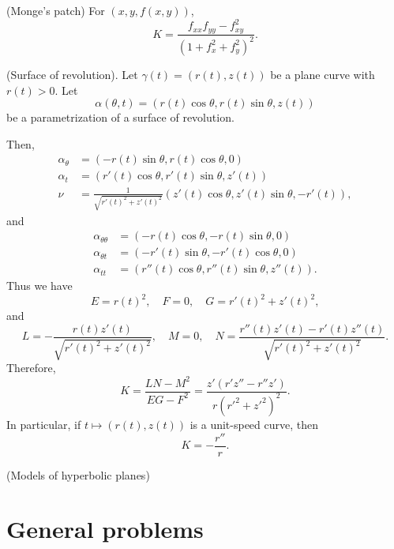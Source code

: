 \documentclass{../note}
\def\a{\alpha}
\begin{document}
\begin{ex}
\begin{parts}
\item
(Monge's patch)
For $(x,y,f(x,y))$,
\[K=\frac{f_{xx}f_{yy}-f_{xy}^2}{(1+f_x^2+f_y^2)^2}.\]
\item
(Surface of revolution).
Let $\gamma(t)=(r(t),z(t))$ be a plane curve with $r(t)>0$.
Let
\[\a(\theta,t)=(r(t)\cos\theta,r(t)\sin\theta,z(t))\]
be a parametrization of a surface of revolution.

Then,
\begin{align*}
\a_\theta&=(-r(t)\sin\theta,r(t)\cos\theta,0)\\
\a_t&=(r'(t)\cos\theta,r'(t)\sin\theta,z'(t))\\
\nu&=\frac1{\sqrt{r'(t)^2+z'(t)^2}}(z'(t)\cos\theta,z'(t)\sin\theta,-r'(t)),
\end{align*}
and
\begin{align*}
\a_{\theta\theta}&=(-r(t)\cos\theta,-r(t)\sin\theta,0)\\
\a_{\theta t}&=(-r'(t)\sin\theta,-r'(t)\cos\theta,0)\\
\a_{tt}&=(r''(t)\cos\theta,r''(t)\sin\theta,z''(t)).
\end{align*}
Thus we have
\[E=r(t)^2,\quad F=0,\quad G=r'(t)^2+z'(t)^2,\]
and
\[L=-\frac{r(t)z'(t)}{\sqrt{r'(t)^2+z'(t)^2}},\quad M=0,\quad N=\frac{r''(t)z'(t)-r'(t)z''(t)}{\sqrt{r'(t)^2+z'(t)^2}}.\]
Therefore,
\[K=\frac{LN-M^2}{EG-F^2}=\frac{z'(r'z''-r''z')}{r(r'^2+z'^2)^2}.\]
In particular, if $t\mapsto(r(t),z(t))$ is a unit-speed curve, then
\[K=-\frac{r''}r.\]

\item
(Models of hyperbolic planes)
\end{parts}
\end{ex}








\section{General problems}

\end{document}

